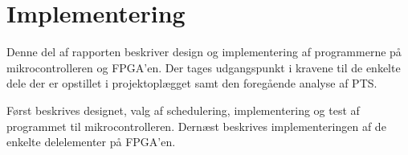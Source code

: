 \part{Implementering}
Denne del af rapporten beskriver design og implementering af programmerne på mikrocontrolleren og FPGA'en. Der tages udgangspunkt i kravene til de enkelte dele der er opstillet i projektoplægget samt den foregående analyse af PTS. 

Først beskrives designet, valg af schedulering,  implementering og test af programmet til mikrocontrolleren. Dernæst beskrives implementeringen af de enkelte delelementer på FPGA'en.


%


